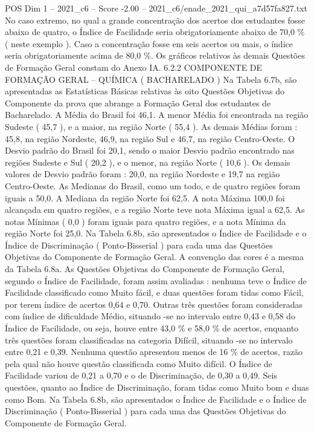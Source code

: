 \begin{textsample}{POS Dim 1 – 2021\_c6 – Score -2.00 – 2021\_c6/enade\_2021\_qui\_a7d57fa827.txt}
No caso extremo, no qual a grande concentração dos acertos dos estudantes fosse abaixo de quatro, o Índice de Facilidade seria obrigatoriamente abaixo de 70,0 \% ( neste exemplo ).
Caso a concentração fosse em seis acertos ou mais, o índice seria obrigatoriamente acima de 80,0 \%.
Os gráficos relativos às demais Questões de Formação Geral constam do Anexo IA. 6.2.2 COMPONENTE DE FORMAÇÃO GERAL – QUÍMICA ( BACHARELADO ) Na Tabela 6.7b, são apresentadas as Estatísticas Básicas relativas às oito Questões Objetivas do Componente da prova que abrange a Formação Geral dos estudantes de Bacharelado.
A Média do Brasil foi 46,1.
A menor Média foi encontrada na região Sudeste ( 45,7 ), e a maior, na região Norte ( 55,4 ).
As demais Médias foram : 45,8, na região Nordeste, 46,9, na região Sul e 46,7, na região Centro-Oeste.
O Desvio padrão do Brasil foi 20,1, sendo o maior Desvio padrão encontrado nas regiões Sudeste e Sul ( 20,2 ), e o menor, na região Norte ( 10,6 ).
Os demais valores de Desvio padrão foram : 20,0, na região Nordeste e 19,7 na região Centro-Oeste.
As Medianas do Brasil, como um todo, e de quatro regiões foram iguais a 50,0.
A Mediana da região Norte foi 62,5.
A nota Máxima 100,0 foi alcançada em quatro regiões, e a região Norte teve nota Máxima igual a 62,5.
As notas Mínimas ( 0,0 ) foram iguais para quatro regiões, e a nota Mínima da região Norte foi 25,0.
Na Tabela 6.8b, são apresentados o Índice de Facilidade e o Índice de Discriminação ( Ponto-Bisserial ) para cada uma das Questões Objetivas do Componente de Formação Geral.
A convenção das cores é a mesma da Tabela 6.8a.
As Questões Objetivas do Componente de Formação Geral, segundo o Índice de Facilidade, foram assim avaliadas : nenhuma teve o Índice de Facilidade classificado como Muito fácil, e duas questões foram tidas como Fácil, por terem índice de acertos 0,64 e 0,70.
Outras três questões foram consideradas com índice de dificuldade Médio, situando -se no intervalo entre 0,43 e 0,58 do Índice de Facilidade, ou seja, houve entre 43,0 \% e 58,0 \% de acertos, enquanto três questões foram classificadas na categoria Difícil, situando -se no intervalo entre 0,21 e 0,39.
Nenhuma questão apresentou menos de 16 \% de acertos, razão pela qual não houve questão classificada como Muito difícil.
O Índice de Facilidade variou de 0,21 a 0,70 e o de Discriminação, de 0,30 a 0,49.
Seis questões, quanto ao Índice de Discriminação, foram tidas como Muito bom e duas como Bom.
Na Tabela 6.8b, são apresentados o Índice de Facilidade e o Índice de Discriminação ( Ponto-Bisserial ) para cada uma das Questões Objetivas do Componente de Formação Geral.

\end{textsample}
